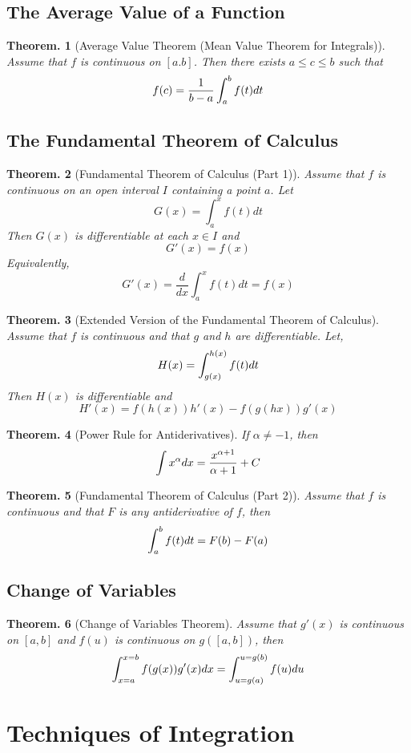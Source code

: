 \documentclass[11pt, a4paper]{memoir}
\theoremstyle{change}
\newtheorem{theorem}{Theorem.}[section]
\theoremstyle{plain}
\theoremstyle{nonumberplain}
\numberwithin{equation}{section}
\begin{document}
\section{The Average Value of a Function}
\begin{theorem}[Average Value Theorem (Mean Value Theorem for Integrals)]
    Assume that $f$ is continuous on $[a.b]$. Then there exists $a \le c \le b$ such that $$f(c) = \dfrac{1}{b-a}\int^b_af(t) \space dt$$
\end{theorem}
\section{The Fundamental Theorem of Calculus}
\begin{theorem}[Fundamental Theorem of Calculus (Part 1)]
    Assume that $f$ is continuous on an open interval $I$ containing a point $a$. Let $$G(x) =  \int^x_a f(t) dt$$Then $G(x)$ is differentiable at each $x \in I$ and $$G'(x) = f(x)$$ Equivalently, $$G'(x) = \dfrac{d}{dx}\int^x_a f(t) dt = f(x)$$
\end{theorem}
\begin{theorem}[Extended Version of the Fundamental Theorem of Calculus]
    Assume that $f$ is continuous and that $g$ and $h$ are differentiable. Let, $$H(x) = \int^{h(x)}_{g(x)}f(t) \space dt$$ Then $H(x)$ is differentiable and $$H'(x) = f(h(x)) h'(x) - f(g(hx))g'(x)$$
\end{theorem}
\begin{theorem}[Power Rule for Antiderivatives]
    If $\alpha \ne -1$, then $$\int x^\alpha \space dx = \dfrac{x^{\alpha + 1}}{\alpha + 1} + C$$
\end{theorem}
\begin{theorem}[Fundamental Theorem of Calculus (Part 2)]
    Assume that $f$ is continuous and that $F$ is any antiderivative of $f$, then $$\int^b_a f(t)\space dt = F(b) - F(a)$$
\end{theorem}
\section{Change of Variables}
\begin{theorem}[Change of Variables Theorem]
Assume that $g'(x)$ is continuous on $[a,b]$ and $f(u)$ is continuous on $g([a,b])$,  then $$\int^{x=b}_{x=a} f(g(x))g'(x) \space dx = \int^{u = g(b)}_{u = g(a)} f(u) \space du$$
\end{theorem}

\chapter{Techniques of Integration}
\end{document}
